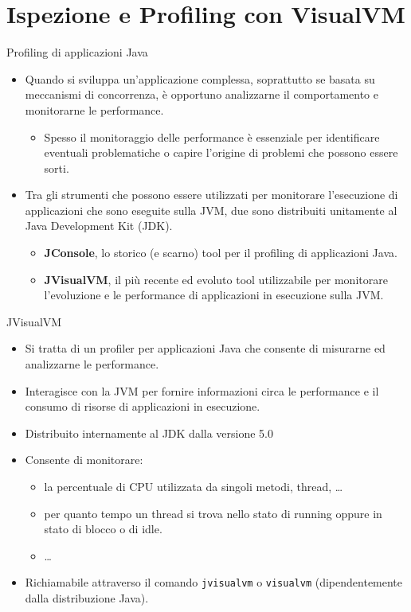 \documentclass[presentation]{beamer}
\begin{document}
\section{Ispezione e Profiling con VisualVM}

\begin{frame}{Profiling di applicazioni Java}
\begin{itemize}\itemsep10pt
\item Quando si sviluppa un'applicazione complessa, soprattutto se basata su meccanismi di concorrenza, è opportuno analizzarne il comportamento e monitorarne le performance.
\begin{itemize}
\item Spesso il monitoraggio delle performance è essenziale per identificare eventuali problematiche o capire l'origine di problemi che possono essere sorti.
\end{itemize}
\item Tra gli strumenti che possono essere utilizzati per monitorare l'esecuzione di applicazioni che sono eseguite sulla JVM, due sono distribuiti unitamente al Java Development Kit (JDK).
\begin{itemize}
\item \textbf{JConsole}, lo storico (e scarno) tool per il profiling di applicazioni Java.
\item \textbf{JVisualVM}, il più recente ed evoluto tool utilizzabile per monitorare l'evoluzione e le performance di applicazioni in esecuzione sulla JVM.
\end{itemize}
\end{itemize}
\end{frame}

\begin{frame}{JVisualVM}
\begin{itemize}\itemsep10pt
\item Si tratta di un profiler per applicazioni Java che consente di misurarne ed analizzarne le performance.
\item Interagisce con la JVM per fornire informazioni circa le performance e il consumo di risorse di applicazioni in esecuzione.
\item Distribuito internamente al JDK dalla versione 5.0
\item Consente di monitorare:
\begin{itemize}
\item la percentuale di CPU utilizzata da singoli metodi, thread, \dots
\item per quanto tempo un thread si trova nello stato di running oppure in stato di blocco o di idle.
\item \dots
\end{itemize}
\item Richiamabile attraverso il comando \texttt{jvisualvm} o \texttt{visualvm} (dipendentemente dalla distribuzione Java).
\end{itemize}
\end{frame}
\end{document}
